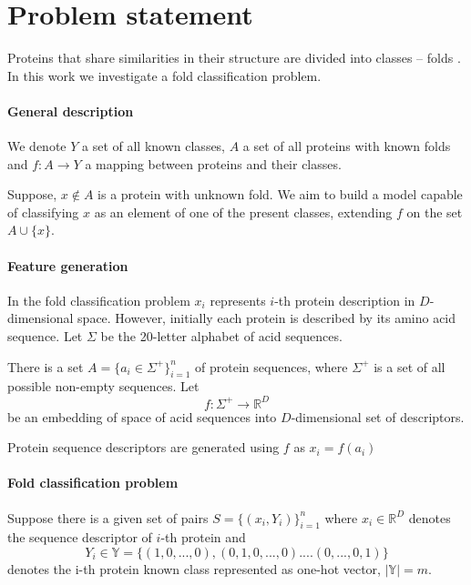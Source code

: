 \documentclass[12pt, twoside]{article}
\begin{document}
\section{Problem statement}
\noindent
Proteins that share similarities in their structure are  divided into classes -- folds \cite{Schaeffer2011}. In this work we investigate a fold classification problem.

\paragraph{General description}
\noindent
  

We denote $Y$ a set of all known classes, $A$ a set of all proteins with known folds and  $f: A \rightarrow Y$ a mapping between proteins and their classes. 

Suppose, $x \not\in A$ is a protein with unknown fold. We aim to build a model capable of classifying $x$ as an element of one of the present classes, extending $f$ on the set $A \cup \{x\}$. 

\paragraph{Feature generation }
\noindent

In the fold classification problem $x_i$ represents $i$-th protein description in  $D$-dimensional space. However, initially each protein is described by its amino acid sequence. Let $\Sigma$ be the 20-letter alphabet of acid sequences.  

There is a set $A = \{a_i \in \Sigma^+\}_{i = 1}^n$ of protein sequences, where $\Sigma^+$ is a set of all possible non-empty sequences. Let $$f: \Sigma^+ \rightarrow \mathbb{R}^D$$ be an embedding of space of acid sequences into $D$-dimensional set of descriptors.


Protein sequence descriptors are generated using $f$ as $x_i = f(a_i)$ 

\paragraph{Fold classification problem}
\noindent

Suppose there is a given set of pairs $S = \{ (x_i, Y_i)\}_{i = 1}^n$ where $ x_i \in \mathbb{R}^D$ denotes the sequence descriptor of $i$-th protein and $$Y_i \in \mathbb{Y} = \{ (1, 0, ..., 0), (0, 1, 0, ..., 0) .... (0, ..., 0, 1) \}$$ denotes the i-th protein known class represented as one-hot vector, $|\mathbb{Y}| = m$.
\end{document}
